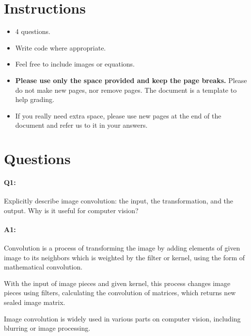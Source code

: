 	\maketitle
	\vspace{-3cm}
	\thispagestyle{fancy}
	
	\section*{Instructions}
	\begin{itemize}
		\item 4 questions.
		\item Write code where appropriate.
		\item Feel free to include images or equations.
		\item \textbf{Please use only the space provided and keep the page breaks.} Please do not make new pages, nor remove pages. The document is a template to help grading.
		\item If you really need extra space, please use new pages at the end of the document and refer us to it in your answers.
	\end{itemize}

	\section*{Questions}
	
	\paragraph{Q1:} Explicitly describe image convolution: the input, the transformation, and the output. Why is it useful for computer vision?
	
	\paragraph{A1:} 
	 Convolution is a process of transforming the image by adding elements of given image to its neighbors which is weighted by the filter or kernel, using the form of mathematical convolution. 
	 
	 With the input of image pieces and given kernel, this process changes image pieces using filters, calculating the convolution of matrices, which returns new sealed image matrix. 
	 
	 Image convolution is widely used in various parts on computer vision, including blurring or image processing.
	
